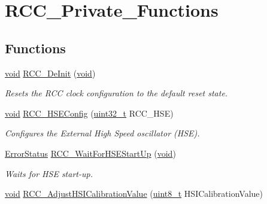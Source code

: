 \hypertarget{group___r_c_c___private___functions}{}\section{R\+C\+C\+\_\+\+Private\+\_\+\+Functions}
\label{group___r_c_c___private___functions}
\subsection*{Functions}
\begin{DoxyCompactItemize}
\item 
\hyperlink{usb__devapi_8h_afabf60e7f57651d6d595a02c75f07cd0}{void} \hyperlink{group___r_c_c___private___functions_ga413f6422be11b1334abe60b3bff2e062}{R\+C\+C\+\_\+\+De\+Init} (\hyperlink{usb__devapi_8h_afabf60e7f57651d6d595a02c75f07cd0}{void})
\begin{DoxyCompactList}\small\item\em Resets the R\+CC clock configuration to the default reset state. \end{DoxyCompactList}\item 
\hyperlink{usb__devapi_8h_afabf60e7f57651d6d595a02c75f07cd0}{void} \hyperlink{group___r_c_c___private___functions_ga432b3281546d23345642d55f8670a93d}{R\+C\+C\+\_\+\+H\+S\+E\+Config} (\hyperlink{_p_e___types_8h_a33594304e786b158f3fb30289278f5af}{uint32\+\_\+t} R\+C\+C\+\_\+\+H\+SE)
\begin{DoxyCompactList}\small\item\em Configures the External High Speed oscillator (H\+SE). \end{DoxyCompactList}\item 
\hyperlink{agilefox_2library_2inc_2stm32f10x__type_8h_a8333b96c67f83cba354b3407fcbb6ee8}{Error\+Status} \hyperlink{group___r_c_c___private___functions_gae0f15692614dd048ee4110a056f001dc}{R\+C\+C\+\_\+\+Wait\+For\+H\+S\+E\+Start\+Up} (\hyperlink{usb__devapi_8h_afabf60e7f57651d6d595a02c75f07cd0}{void})
\begin{DoxyCompactList}\small\item\em Waits for H\+SE start-\/up. \end{DoxyCompactList}\item 
\hyperlink{usb__devapi_8h_afabf60e7f57651d6d595a02c75f07cd0}{void} \hyperlink{group___r_c_c___private___functions_gaa2d6a35f5c2e0f86317c3beb222677fc}{R\+C\+C\+\_\+\+Adjust\+H\+S\+I\+Calibration\+Value} (\hyperlink{_p_e___types_8h_aba7bc1797add20fe3efdf37ced1182c5}{uint8\+\_\+t} H\+S\+I\+Calibration\+Value)

\end{DoxyCompactItemize}
